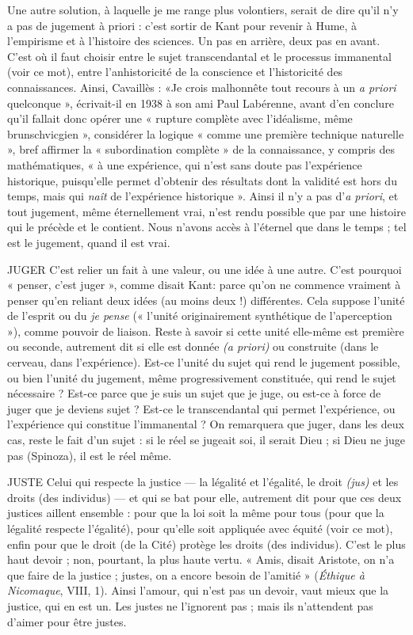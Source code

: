 {Une autre solution, à laquelle je me range plus volontiers, serait de dire
qu'il n’y a pas de jugement à priori : c’est sortir de Kant pour revenir à Hume,
à l’empirisme et à l’histoire des sciences. Un pas en arrière, deux pas en avant.
C’est où il faut choisir entre le sujet transcendantal et le processus immanental
(voir ce mot), entre l’anhistoricité de la conscience et l’historicité des connaissances.
Ainsi, Cavaillès : «Je crois malhonnête tout recours à un {\it a priori}
quelconque », écrivait-il en 1938 à son ami Paul Labérenne, avant d’en
conclure qu’il fallait donc opérer une « rupture complète avec l’idéalisme,
même brunschvicgien », considérer la logique « comme une première technique
naturelle », bref affirmer la « subordination complète » de la connaissance,
y compris des mathématiques, « à une expérience, qui n’est sans doute
pas l'expérience historique, puisqu’elle permet d’obtenir des résultats dont la
validité est hors du temps, mais qui {\it naît} de l’expérience historique ». Ainsi il
n’y a pas d’{\it a priori}, et tout jugement, même éternellement vrai, n’est rendu
possible que par une histoire qui le précède et le contient. Nous n'avons accès
à l’éternel que dans le temps ; tel est le jugement, quand il est vrai.

JUGER C’est relier un fait à une valeur, ou une idée à une autre. C’est pourquoi
« penser, c’est juger », comme disait Kant: parce qu'on ne
commence vraiment à penser qu’en reliant deux idées (au moins deux !) différentes.
Cela suppose l’unité de l'esprit ou du {\it je pense} (« l'unité originairement
synthétique de l’aperception »), comme pouvoir de liaison. Reste à savoir si
cette unité elle-même est première ou seconde, autrement dit si elle est donnée
{\it (a priori)} ou construite (dans le cerveau, dans l'expérience). Est-ce l'unité du
sujet qui rend le jugement possible, ou bien l’unité du jugement, même progressivement
constituée, qui rend le sujet nécessaire ? Est-ce parce que je suis
un sujet que je juge, ou est-ce à force de juger que je deviens sujet ? Est-ce le
transcendantal qui permet l’expérience, ou l'expérience qui constitue
l’immanental ? On remarquera que juger, dans les deux cas, reste le fait d’un
sujet : si le réel se jugeait soi, il serait Dieu ; si Dieu ne juge pas (Spinoza), il est
le réel même.

JUSTE Celui qui respecte la justice — la légalité et l'égalité, le droit {\it (jus)} et
les droits (des individus) — et qui se bat pour elle, autrement dit pour
que ces deux justices aillent ensemble : pour que la loi soit la même pour tous
(pour que la légalité respecte l'égalité), pour qu’elle soit appliquée avec équité
(voir ce mot), enfin pour que le droit (de la Cité) protège les droits (des individus).
C’est le plus haut devoir ; non, pourtant, la plus haute vertu. « Amis,
disait Aristote, on n’a que faire de la justice ; justes, on a encore besoin de
l'amitié » ({\it Éthique à Nicomaque}, VIII, 1). Ainsi l'amour, qui n’est pas un
devoir, vaut mieux que la justice, qui en est un. Les justes ne l’ignorent pas ;
mais ils n’attendent pas d’aimer pour être justes.

}
